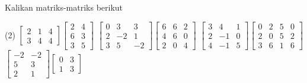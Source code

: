 \begin{exercise}
\pagebreak[2]
Kalikan matriks-matriks berikut
\begin{tasks}(2)
\task
$\begin{bmatrix}
2 & 1 & 4 \\
3 & 4 & 4
\end{bmatrix}
\begin{bmatrix}
2 & 4 \\
6 & 3 \\
3 & 5
\end{bmatrix}$
\task
$\begin{bmatrix}
0 & 3 & 3 \\
2 & -2 & 1 \\
3 & 5 & -2
\end{bmatrix}
\begin{bmatrix}
6 & 6 & 2 \\
4 & 6 & 0 \\
2 & 0 & 4
\end{bmatrix}$
\task
$\begin{bmatrix}
3 & 4 & 1 \\
2 & -1 & 0 \\
4 & -1 & 5
\end{bmatrix}
\begin{bmatrix}
0 & 2 & 5 & 0 \\
2 & 0 & 5 & 2 \\
3 & 6 & 1 & 6
\end{bmatrix}$
\task
$\begin{bmatrix}
-2 & -2 \\
5 & 3 \\
2 & 1
\end{bmatrix}
\begin{bmatrix}
0 & 3 \\
1 & 3
\end{bmatrix}$
\end{tasks}
\end{exercise}

